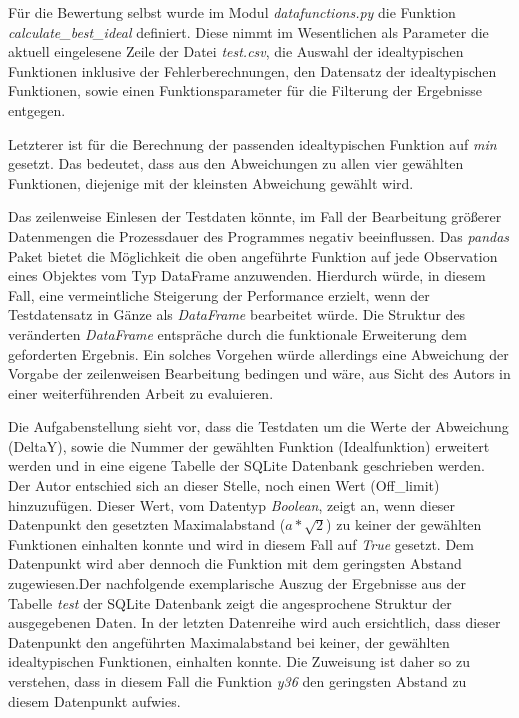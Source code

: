Für die Bewertung selbst wurde im Modul \emph{datafunctions.py} die Funktion \emph{calculate\_best\_ideal} definiert. Diese nimmt im Wesentlichen als Parameter die aktuell eingelesene Zeile der Datei \emph{test.csv}, die Auswahl der idealtypischen Funktionen inklusive der Fehlerberechnungen, den Datensatz der idealtypischen Funktionen, sowie einen Funktionsparameter für die Filterung der Ergebnisse entgegen. 

Letzterer ist für die Berechnung der passenden idealtypischen Funktion auf \emph{min} gesetzt. Das bedeutet, dass aus den Abweichungen zu allen vier gewählten Funktionen, diejenige mit der kleinsten Abweichung gewählt wird.

Das zeilenweise Einlesen der Testdaten könnte, im Fall der Bearbeitung größerer Datenmengen die Prozessdauer des Programmes negativ beeinflussen. Das \emph{pandas} Paket bietet die Möglichkeit die oben angeführte Funktion auf jede Observation eines Objektes vom Typ DataFrame anzuwenden. Hierdurch würde, in diesem Fall, eine vermeintliche Steigerung der Performance erzielt, wenn der Testdatensatz in Gänze als \emph{DataFrame} bearbeitet würde. Die Struktur des veränderten \emph{DataFrame} entspräche durch die funktionale Erweiterung dem geforderten Ergebnis. Ein solches Vorgehen würde allerdings eine Abweichung der Vorgabe der zeilenweisen Bearbeitung bedingen und wäre, aus Sicht des Autors in einer weiterführenden Arbeit zu evaluieren.   

Die Aufgabenstellung sieht vor, dass die Testdaten um die Werte der Abweichung (DeltaY), sowie die Nummer der gewählten Funktion (Idealfunktion) erweitert werden und in eine eigene Tabelle der SQLite Datenbank geschrieben werden. Der Autor entschied sich an dieser Stelle, noch einen Wert (Off\_limit) hinzuzufügen. Dieser Wert, vom Datentyp \emph{Boolean}, zeigt an, wenn dieser Datenpunkt den gesetzten Maximalabstand ($a*\sqrt{2}$) zu keiner der gewählten Funktionen einhalten konnte und wird in diesem Fall auf \emph{True} gesetzt. Dem Datenpunkt wird aber dennoch die Funktion mit dem geringsten Abstand zugewiesen.Der nachfolgende exemplarische Auszug der Ergebnisse aus der Tabelle \emph{test} der SQLite Datenbank zeigt die angesprochene Struktur der ausgegebenen Daten. In der letzten Datenreihe wird auch ersichtlich, dass dieser Datenpunkt den angeführten Maximalabstand bei keiner, der gewählten idealtypischen Funktionen, einhalten konnte. Die Zuweisung ist daher so zu verstehen, dass in diesem Fall die Funktion \emph{y36} den geringsten Abstand zu diesem Datenpunkt aufwies.

